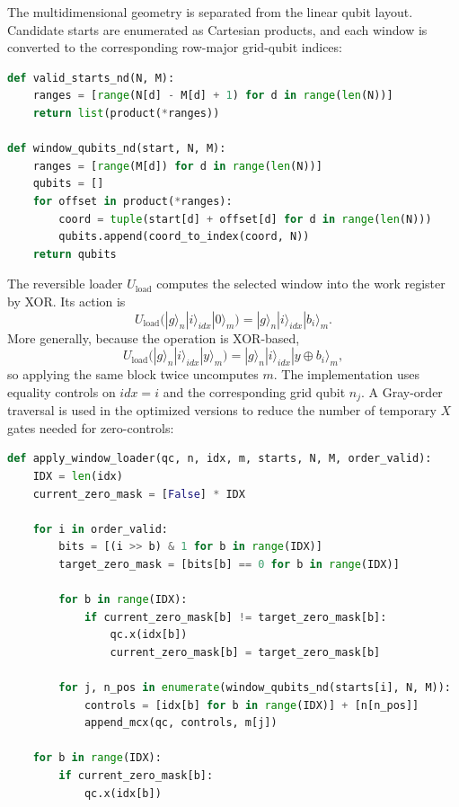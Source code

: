 The multidimensional geometry is separated from the linear qubit layout.  Candidate starts are enumerated as Cartesian products, and each window is converted to the corresponding row-major grid-qubit indices:

\begin{lstlisting}[language=Python, caption={Enumeration of candidate starts and loaded window cells.}]
def valid_starts_nd(N, M):
    ranges = [range(N[d] - M[d] + 1) for d in range(len(N))]
    return list(product(*ranges))

def window_qubits_nd(start, N, M):
    ranges = [range(M[d]) for d in range(len(N))]
    qubits = []
    for offset in product(*ranges):
        coord = tuple(start[d] + offset[d] for d in range(len(N)))
        qubits.append(coord_to_index(coord, N))
    return qubits
\end{lstlisting}

The reversible loader \(U_{\mathrm{load}}\) computes the selected window into the work register by XOR.  Its action is
\begin{equation}
    U_{\mathrm{load}}
    \bigl(
    |g\rangle_n |i\rangle_{idx} |0\rangle_m
    \bigr)
    =
    |g\rangle_n |i\rangle_{idx} |b_i\rangle_m.
\end{equation}
More generally, because the operation is XOR-based,
\begin{equation}
    U_{\mathrm{load}}
    \bigl(
    |g\rangle_n |i\rangle_{idx} |y\rangle_m
    \bigr)
    =
    |g\rangle_n |i\rangle_{idx} |y \oplus b_i\rangle_m,
\end{equation}
so applying the same block twice uncomputes \(m\).  The implementation uses equality controls on \(idx=i\) and the corresponding grid qubit \(n_j\).  A Gray-order traversal is used in the optimized versions to reduce the number of temporary \(X\) gates needed for zero-controls:

\begin{lstlisting}[language=Python, caption={Reversible window loader used by the explicit-grid versions.}]
def apply_window_loader(qc, n, idx, m, starts, N, M, order_valid):
    IDX = len(idx)
    current_zero_mask = [False] * IDX

    for i in order_valid:
        bits = [(i >> b) & 1 for b in range(IDX)]
        target_zero_mask = [bits[b] == 0 for b in range(IDX)]

        for b in range(IDX):
            if current_zero_mask[b] != target_zero_mask[b]:
                qc.x(idx[b])
                current_zero_mask[b] = target_zero_mask[b]

        for j, n_pos in enumerate(window_qubits_nd(starts[i], N, M)):
            controls = [idx[b] for b in range(IDX)] + [n[n_pos]]
            append_mcx(qc, controls, m[j])

    for b in range(IDX):
        if current_zero_mask[b]:
            qc.x(idx[b])
\end{lstlisting}

